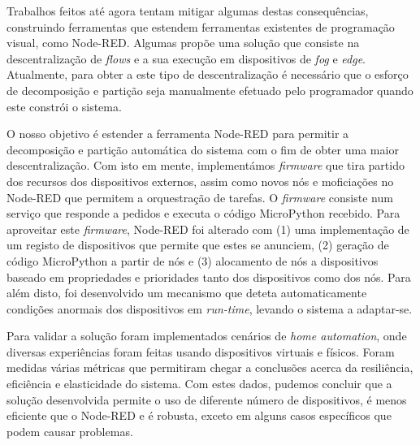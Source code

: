 Trabalhos feitos até agora tentam mitigar algumas destas consequências, construindo ferramentas que estendem ferramentas existentes de programação visual, como Node-RED. Algumas propõe uma solução que consiste na descentralização de \emph{flows} e a sua execução em dispositivos de \emph{fog} e \emph{edge}. Atualmente, para obter a este tipo de descentralização é necessário que o esforço de decomposição e partição seja manualmente efetuado pelo programador quando este constrói o sistema.

O nosso objetivo é estender a ferramenta Node-RED para permitir a decomposição e partição automática do sistema com o fim de obter uma maior descentralização. Com isto em mente, implementámos \textit{firmware} que tira partido dos recursos dos dispositivos externos, assim como novos nós e moficiações no Node-RED que permitem a orquestração de tarefas. O \textit{firmware} consiste num serviço que responde a pedidos e executa o código MicroPython recebido. Para aproveitar este \textit{firmware}, Node-RED foi alterado com (1) uma implementação de um registo de dispositivos que permite que estes se anunciem, (2) geração de código MicroPython a partir de nós e (3) alocamento de nós a dispositivos baseado em propriedades e prioridades tanto dos dispositivos como dos nós. Para além disto, foi desenvolvido um mecanismo que deteta automaticamente condições anormais dos dispositivos em \emph{run-time}, levando o sistema a adaptar-se.

Para validar a solução foram implementados cenários de \textit{home automation}, onde diversas experiências foram feitas usando dispositivos virtuais e físicos. Foram medidas várias métricas que permitiram chegar a conclusões acerca da resiliência, eficiência e elasticidade do sistema. Com estes dados, pudemos concluir que a solução desenvolvida permite o uso de diferente número de dispositivos, é menos eficiente que o Node-RED e é robusta, exceto em alguns casos específicos que podem causar problemas.

\vspace*{10mm}\noindent
